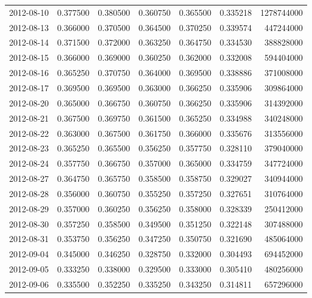 \begin{tabular}{lrrrrrr}
2012-08-10 &    0.377500 &    0.380500 &    0.360750 &    0.365500 &    0.335218 &  1278744000 \\
2012-08-13 &    0.366000 &    0.370500 &    0.364500 &    0.370250 &    0.339574 &   447244000 \\
2012-08-14 &    0.371500 &    0.372000 &    0.363250 &    0.364750 &    0.334530 &   388828000 \\
2012-08-15 &    0.366000 &    0.369000 &    0.360250 &    0.362000 &    0.332008 &   594404000 \\
2012-08-16 &    0.365250 &    0.370750 &    0.364000 &    0.369500 &    0.338886 &   371008000 \\
2012-08-17 &    0.369500 &    0.369500 &    0.363000 &    0.366250 &    0.335906 &   309864000 \\
2012-08-20 &    0.365000 &    0.366750 &    0.360750 &    0.366250 &    0.335906 &   314392000 \\
2012-08-21 &    0.367500 &    0.369750 &    0.361500 &    0.365250 &    0.334988 &   340248000 \\
2012-08-22 &    0.363000 &    0.367500 &    0.361750 &    0.366000 &    0.335676 &   313556000 \\
2012-08-23 &    0.365250 &    0.365500 &    0.356250 &    0.357750 &    0.328110 &   379040000 \\
2012-08-24 &    0.357750 &    0.366750 &    0.357000 &    0.365000 &    0.334759 &   347724000 \\
2012-08-27 &    0.364750 &    0.365750 &    0.358500 &    0.358750 &    0.329027 &   340944000 \\
2012-08-28 &    0.356000 &    0.360750 &    0.355250 &    0.357250 &    0.327651 &   310764000 \\
2012-08-29 &    0.357000 &    0.360250 &    0.356250 &    0.358000 &    0.328339 &   250412000 \\
2012-08-30 &    0.357250 &    0.358500 &    0.349500 &    0.351250 &    0.322148 &   307488000 \\
2012-08-31 &    0.353750 &    0.356250 &    0.347250 &    0.350750 &    0.321690 &   485064000 \\
2012-09-04 &    0.345000 &    0.346250 &    0.328750 &    0.332000 &    0.304493 &   694452000 \\
2012-09-05 &    0.333250 &    0.338000 &    0.329500 &    0.333000 &    0.305410 &   480256000 \\
2012-09-06 &    0.335500 &    0.352250 &    0.335250 &    0.343250 &    0.314811 &   657296000 \\

\end{tabular}
